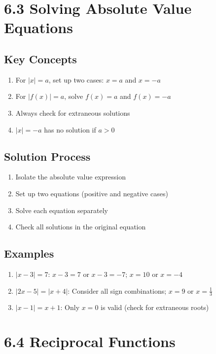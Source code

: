 \documentclass[12pt]{article}
\begin{document}
\section{6.3 Solving Absolute Value Equations}
\subsection*{Key Concepts}
\begin{tcolorbox}[colback=lightgray,colframe=primary,title=Solving Absolute Value Equations]
    \begin{enumerate}
        \item For $|x| = a$, set up two cases: $x = a$ and $x = -a$
        \item For $|f(x)| = a$, solve $f(x) = a$ and $f(x) = -a$
        \item Always check for extraneous solutions
        \item $|x| = -a$ has no solution if $a > 0$
    \end{enumerate}
\end{tcolorbox}

\subsection*{Solution Process}
\begin{enumerate}
    \item Isolate the absolute value expression
    \item Set up two equations (positive and negative cases)
    \item Solve each equation separately
    \item Check all solutions in the original equation
\end{enumerate}

\subsection*{Examples}
\begin{enumerate}
    \item $|x-3| = 7$: $x-3 = 7$ or $x-3 = -7$; $x = 10$ or $x = -4$
    \item $|2x-5| = |x+4|$: Consider all sign combinations; $x = 9$ or $x = \frac{1}{3}$
    \item $|x-1| = x+1$: Only $x = 0$ is valid (check for extraneous roots)
\end{enumerate}

\section{6.4 Reciprocal Functions}
\end{document}
